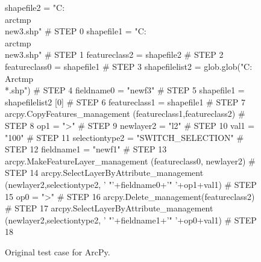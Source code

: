 \begin{figure}[t]
{\scriptsize 
\begin{code}
shapefile2 = "C:\\arctmp\\new3.shp"                \# STEP 0 
shapefile1 = "C:\\arctmp\\new3.shp"                \# STEP 1
featureclass2 = shapefile2                       \# STEP 2
featureclass0 = shapefile1                       \# STEP 3
shapefilelist2 = 
   glob.glob("C:\\Arctmp\\*.shp")                  \# STEP 4
fieldname0 = "newf3"                             \# STEP 5
shapefile1 = shapefilelist2 [0]                  \# STEP 6
featureclass1 = shapefile1                       \# STEP 7
arcpy.CopyFeatures\_management
   (featureclass1,featureclass2)                 \# STEP 8
op1 = ">"                                        \# STEP 9
newlayer2 = "l2"                                 \# STEP 10
val1 = "100"                                     \# STEP 11
selectiontype2 = "SWITCH\_SELECTION"              \# STEP 12
fieldname1 = "newf1"                             \# STEP 13
arcpy.MakeFeatureLayer\_management
   (featureclass0, newlayer2)                    \# STEP 14
arcpy.SelectLayerByAttribute\_management
   (newlayer2,selectiontype2,
   ' "'+fieldname0+'" '+op1+val1)                \# STEP 15
op0 = ">"                                        \# STEP 16
arcpy.Delete\_management(featureclass2)           \# STEP 17
arcpy.SelectLayerByAttribute\_management
   (newlayer2,selectiontype2,
   ' "'+fieldname1+'" '+op0+val1)                \# STEP 18
\end{code}
}
\caption{Original test case for ArcPy.}
\label{esriorig}
\end{figure}

